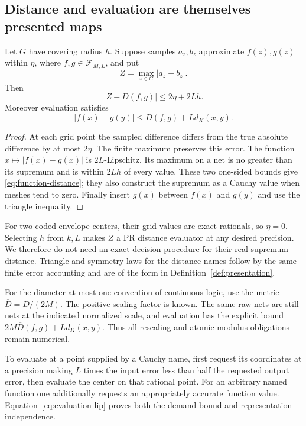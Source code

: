 \subsection{Distance and evaluation are themselves presented maps}

\begin{lemma}\label{lem:function-distance}
Let \(G\) have covering radius \(h\). Suppose samples \(a_z,b_z\) approximate \(f(z),g(z)\) within \(\eta\), where \(f,g\in\mathcal F_{M,L}\), and put
\[
  Z=\max_{z\in G}|a_z-b_z|.
\]
Then
\begin{equation}
  |Z-D(f,g)|\leq2\eta+2Lh.
 \label{eq:function-distance}
\end{equation}
Moreover evaluation satisfies
\begin{equation}
 |f(x)-g(y)|\leq D(f,g)+Ld_K(x,y).
 \label{eq:evaluation-lip}
\end{equation}
\end{lemma}

\begin{proof}
At each grid point the sampled difference differs from the true absolute difference by at most \(2\eta\). The finite maximum preserves this error. The function \(x\mapsto|f(x)-g(x)|\) is \(2L\)-Lipschitz. Its maximum on a net is no greater than its supremum and is within \(2Lh\) of every value. These two one-sided bounds give \eqref{eq:function-distance}; they also construct the supremum as a Cauchy value when meshes tend to zero. Finally insert \(g(x)\) between \(f(x)\) and \(g(y)\) and use the triangle inequality.
\end{proof}

For two coded envelope centers, their grid values are exact rationals, so \(\eta=0\). Selecting \(h\) from \(k,L\) makes \(Z\) a PR distance evaluator at any desired precision. We therefore do not need an exact decision procedure for their real supremum distance. Triangle and symmetry laws for the distance names follow by the same finite error accounting and are of the form in Definition~\ref{def:presentation}.

For the diameter-at-most-one convention of continuous logic, use the metric \(\overline D=D/(2M)\). The positive scaling factor is known. The same raw nets are still nets at the indicated normalized scale, and evaluation has the explicit bound \(2M\overline D(f,g)+Ld_K(x,y)\). Thus all rescaling and atomic-modulus obligations remain numerical.

To evaluate at a point supplied by a Cauchy name, first request its coordinates at a precision making \(L\) times the input error less than half the requested output error, then evaluate the center on that rational point. For an arbitrary named function one additionally requests an appropriately accurate function value. Equation~\eqref{eq:evaluation-lip} proves both the demand bound and representation independence.


